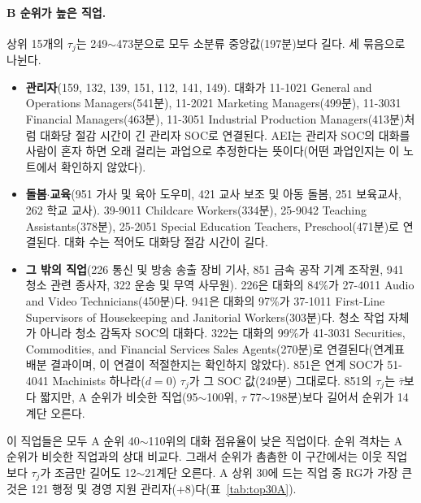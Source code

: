 \documentclass[11pt]{article}
\begin{document}
\paragraph{B 순위가 높은 직업.} 상위 15개의 $\tau_j$는 249$\sim$473분으로 모두 소분류 중앙값(197분)보다 길다. 세 묶음으로 나뉜다.
\begin{itemize}[leftmargin=*]
  \item \textbf{관리자}(159, 132, 139, 151, 112, 141, 149). 대화가 11-1021 General and Operations Managers(541분), 11-2021 Marketing Managers(499분), 11-3031 Financial Managers(463분), 11-3051 Industrial Production Managers(413분)처럼 대화당 절감 시간이 긴 관리자 SOC로 연결된다. AEI는 관리자 SOC의 대화를 사람이 혼자 하면 오래 걸리는 과업으로 추정한다는 뜻이다(어떤 과업인지는 이 노트에서 확인하지 않았다).
  \item \textbf{돌봄$\cdot$교육}(951 가사 및 육아 도우미, 421 교사 보조 및 아동 돌봄, 251 보육교사, 262 학교 교사). 39-9011 Childcare Workers(334분), 25-9042 Teaching Assistants(378분), 25-2051 Special Education Teachers, Preschool(471분)로 연결된다. 대화 수는 적어도 대화당 절감 시간이 길다.
  \item \textbf{그 밖의 직업}(226 통신 및 방송 송출 장비 기사, 851 금속 공작 기계 조작원, 941 청소 관련 종사자, 322 운송 및 무역 사무원). 226은 대화의 84\%가 27-4011 Audio and Video Technicians(450분)다. 941은 대화의 97\%가 37-1011 First-Line Supervisors of Housekeeping and Janitorial Workers(303분)다. 청소 작업 자체가 아니라 청소 감독자 SOC의 대화다. 322는 대화의 99\%가 41-3031 Securities, Commodities, and Financial Services Sales Agents(270분)로 연결된다(연계표 배분 결과이며, 이 연결이 적절한지는 확인하지 않았다). 851은 연계 SOC가 51-4041 Machinists 하나라($d = 0$) $\tau_j$가 그 SOC 값(249분) 그대로다. 851의 $\tau_j$는 $\bar\tau$보다 짧지만, A 순위가 비슷한 직업(95$\sim$100위, $\tau$ 77$\sim$198분)보다 길어서 순위가 14계단 오른다.
\end{itemize}
이 직업들은 모두 A 순위 40$\sim$110위의 대화 점유율이 낮은 직업이다. 순위 격차는 A 순위가 비슷한 직업과의 상대 비교다. 그래서 순위가 촘촘한 이 구간에서는 이웃 직업보다 $\tau_j$가 조금만 길어도 12$\sim$21계단 오른다. A 상위 30에 드는 직업 중 RG가 가장 큰 것은 121 행정 및 경영 지원 관리자(+8)다(표~\ref{tab:top30A}).
\end{document}

